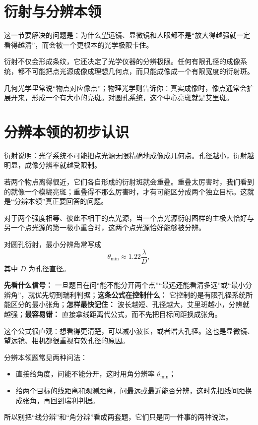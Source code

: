 \documentclass[lang=cn,11pt]{elegantbook}
\newcommand{\bridge}[1]{\begin{note}#1\end{note}}
\begin{document}
\section{衍射与分辨本领}

这一节要解决的问题是：为什么望远镜、显微镜和人眼都不是“放大得越强就一定看得越清”，而会被一个更根本的光学极限卡住。

衍射不仅会形成条纹，它还决定了光学仪器的分辨极限。任何有限孔径的成像系统，都不可能把点光源成像成理想几何点，而只能成像成一个有限宽度的衍射斑。

\begin{note}
几何光学里常说“物点对应像点”；物理光学则告诉你：真实成像时，像点通常会扩展开来，形成一个有大小的亮斑。对圆孔系统，这个中心亮斑就是艾里斑。
\end{note}

\section{分辨本领的初步认识}

衍射说明：光学系统不可能把点光源无限精确地成像成几何点。孔径越小，衍射越明显，成像分辨率就越受限制。

若两个物点离得很近，它们各自形成的衍射斑就会重叠。重叠太厉害时，我们看到的就像一个模糊亮斑；重叠得不那么厉害时，才有可能区分成两个独立目标。这就是“分辨本领”真正要回答的问题。

\begin{theorem}[瑞利判据]\label{thm:rayleigh-criterion}
对于两个强度相等、彼此不相干的点光源，当一个点光源衍射图样的主极大恰好与另一个点光源的第一极小重合时，这两个点光源恰好能够被分辨。
\end{theorem}

对圆孔衍射，最小分辨角常写成
\[
\theta_{\min}\approx 1.22\frac{\lambda}{D},
\]
其中 \(D\) 为孔径直径。

\begin{note}
\textbf{先看什么信号：} 一旦题目在问“能不能分开两个点”“最远还能看清多远”或“最小分辨角”，就优先切到瑞利判据；\textbf{这条公式在控制什么：} 它控制的是有限孔径系统所能区分的最小张角；\textbf{怎样最快记住：} 波长越短、孔径越大，艾里斑越小，分辨就越强；\textbf{最容易错：} 直接拿线距离代公式，而不先把目标间距换成张角。
\end{note}

\bridge{这个公式很直观：想看得更清楚，可以减小波长，或者增大孔径。这也是显微镜、望远镜、相机都很重视有效孔径的原因。}

\begin{remark}
分辨本领题常见两种问法：
\begin{itemize}
  \item 直接给角度，问能不能分开，这时用角分辨率 \(\theta_{\min}\)；
  \item 给两个目标的线距离和观测距离，问最远或最近能否分辨，这时先把线间距换成张角，再回到瑞利判据。
\end{itemize}
所以别把“线分辨”和“角分辨”看成两套题，它们只是同一件事的两种说法。
\end{remark}
\end{document}

